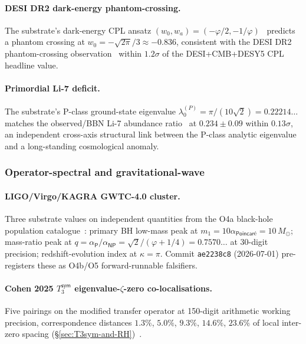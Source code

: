 \documentclass[11pt,a4paper]{amsart}
\theoremstyle{plain}
\theoremstyle{definition}
\begin{document}
\paragraph{DESI DR2 dark-energy phantom-crossing.} The substrate's dark-energy CPL ansatz $(w_0, w_a) = (-\varphi/2, -1/\varphi)$~\cite{cohen2026book} predicts a phantom crossing at $w_0 = -\sqrt{2\pi}/3 \approx -0.836$, consistent with the DESI DR2 phantom-crossing observation~\cite{desi-dr2-w0wa} within $1.2\sigma$ of the DESI+CMB+DESY5 CPL headline value.

\paragraph{Primordial Li-7 deficit.} The substrate's P-class ground-state eigenvalue $\lambda_0^{(P)} = \pi/(10\sqrt{2}) = 0.22214\ldots$ matches the observed/BBN Li-7 abundance ratio~\cite{li7-deficit-2025} at $0.234 \pm 0.09$ within $0.13\sigma$, an independent cross-axis structural link between the P-class analytic eigenvalue and a long-standing cosmological anomaly.

\subsubsection*{Operator-spectral and gravitational-wave}

\paragraph{LIGO/Virgo/KAGRA GWTC-4.0 cluster.} Three substrate values on independent quantities from the O4a black-hole population catalogue~\cite{ligo-gwtc4-cat,ligo-gwtc4-pop}: primary BH low-mass peak at $m_1 = 10 \alpha_{\textsf{Poincar\'e}} = 10\, M_\odot$; mass-ratio peak at $q = \alpha_{\textsf{P}}/\alpha_{\textsf{NP}} = \sqrt{2}/(\varphi + 1/4) = 0.7570\ldots$ at 30-digit precision; redshift-evolution index at $\kappa = \pi$. Commit \texttt{ae2238c8} (2026-07-01) pre-registers these as O4b/O5 forward-runnable falsifiers.

\paragraph{Cohen 2025 $T_3^{\textsf{sym}}$ eigenvalue-$\zeta$-zero co-localisations.} Five pairings on the modified transfer operator at 150-digit arithmetic working precision, correspondence distances $1.3\%$, $5.0\%$, $9.3\%$, $14.6\%$, $23.6\%$ of local inter-zero spacing (\S\ref{sec:T3sym-and-RH})~\cite{cohen2025transferOp}.
\end{document}
